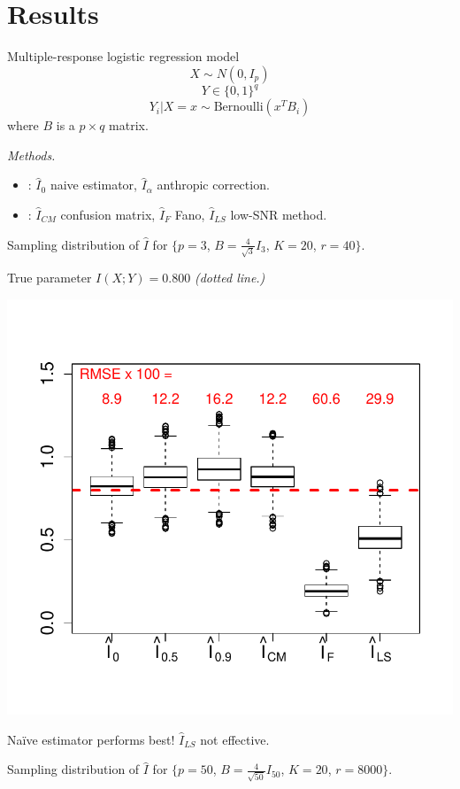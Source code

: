 \documentclass{article}
\begin{document}
\section{Results}

Multiple-response logistic regression model
\[
X \sim N(0, I_p)
\]
\[
Y \in \{0,1\}^q
\]
\[
Y_i|X = x \sim \text{Bernoulli}(x^T B_i)
\]
where $B$ is a $p \times q$ matrix.

\emph{Methods.}
\begin{itemize}
\item {}: $\hat{I}_0$ naive estimator, $\hat{I}_\alpha$ anthropic correction.
\item {}: $\hat{I}_{CM}$ confusion matrix, $\hat{I}_F$ Fano, $\hat{I}_{LS}$ low-SNR method.
\end{itemize}

Sampling distribution of $\hat{I}$ for \small{$\{p = 3$, $B = \frac{4}{\sqrt{3}} I_3$, $K = 20$, $r = 40\}$.}

True parameter $I(X; Y) = 0.800$ \emph{(dotted line.)}
\begin{center}
\includegraphics[scale = 0.5, clip = true, trim = 0 0.5in 0 0.5in]{../info_theory_sims/fig1.pdf}
\end{center}
Na\"{i}ve estimator performs best!  $\hat{I}_{LS}$ not effective.

Sampling distribution of $\hat{I}$ for \small{$\{p = 50$, $B = \frac{4}{\sqrt{50}} I_{50}$, $K = 20$, $r = 8000\}$.}
\end{document}
